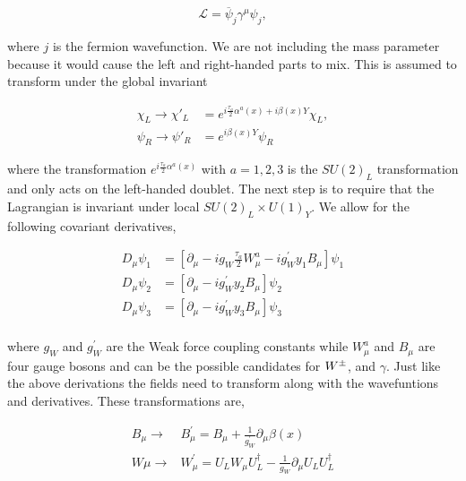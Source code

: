 \begin{equation}\label{WeakL}
\mathcal{L}=\overline{\psi}_j\gamma^\mu\psi_j,
\end{equation}

where $j$ is the fermion wavefunction. We are not including the mass parameter because it would cause the left and right-handed parts to mix.  This is assumed to transform under the global invariant

\begin{equation}\label{WeakGlobal}
\begin{split}
\chi_L\rightarrow\chi'_L&=e^{i\frac{\tau_a}{2}\alpha^a(x)+i\beta(x)Y}\chi_L, \\
\psi_R\rightarrow\psi'_R&=e^{i\beta(x)Y}\psi_R
\end{split}
\end{equation}

where the transformation $e^{i\frac{\tau_a}{2}\alpha^a(x)}$ with $a = 1, 2, 3$ is the $SU(2)_L$ transformation and only acts on the left-handed doublet. The next step is to require that the Lagrangian is invariant under local $SU(2)_L\times U(1)_Y$. We allow for the following covariant derivatives,

\begin{equation}
\begin{split}
D_\mu\psi_1&=[\partial_\mu-ig_W\frac{\tau_a}{2}W_\mu^a-ig_W^\prime y_1 B_\mu]\psi_1 \\
D_\mu\psi_2&=[\partial_\mu-ig_W^\prime y_2 B_\mu]\psi_2 \\
D_\mu\psi_3&=[\partial_\mu-ig_W^\prime y_3 B_\mu]\psi_3 \\
\end{split}
\end{equation}

where $g_W$ and $g_W^{\prime}$ are the Weak force coupling constants while $W_\mu^a$ and $B_\mu$ are four gauge bosons and can be the possible candidates for $W^\pm$, \Z and $\gamma$.  Just like the above derivations the fields need to transform along with the wavefuntions and derivatives. These transformations are,

\begin{equation}
\begin{split}
B_\mu\rightarrow&B^\prime_\mu=B_\mu+\frac{1}{g_W^\prime}\partial_\mu\beta(x) \\
W\mu\rightarrow&W^\prime_\mu=U_L W_\mu U^\dagger_L-\frac{1}{g_W}\partial_\mu U_L U_L^\dagger \\
\end{split}
\end{equation}

